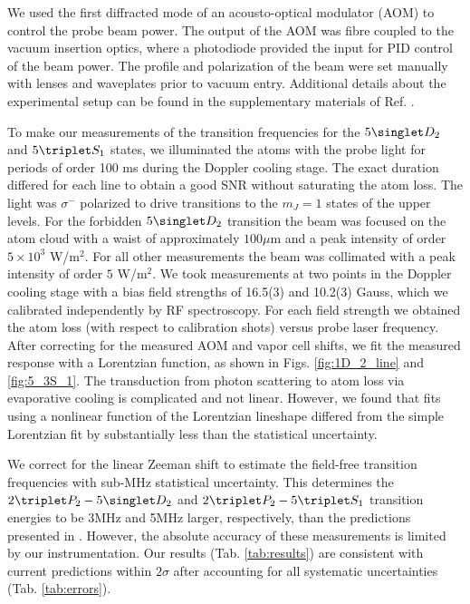 We used the first diffracted mode of an acousto-optical modulator (AOM) to control the probe beam power. The output of the AOM was fibre coupled to the vacuum insertion optics, where a photodiode provided the input for PID control of the beam power. The profile and polarization of the beam were set manually with lenses and waveplates prior to vacuum entry. Additional details about the experimental setup can be found in the supplementary materials of Ref. \cite{Thomas20}.


To make our measurements of the transition frequencies for the $5\singlet D_2$ and $5\triplet S_1$ states, we illuminated the atoms with the probe light for periods of order 100 ms during the Doppler cooling stage. The exact duration differed for each line to obtain a good SNR without saturating the atom loss. The light was $\sigma^-$ polarized to drive transitions to the $m_J=1$ states of the upper levels. For the forbidden $5\singlet D_2$ transition the beam was focused on the atom cloud with a waist of approximately $100\mu$m and a peak intensity of order $5\times 10^3$ W/m$^2$. For all other measurements the beam was collimated with a peak intensity of order $ 5$ W/m$^2$. We took measurements at two points in the Doppler cooling stage with a bias field strengths of {16.5(3)} and {10.2(3)} Gauss, which we calibrated independently by RF spectroscopy. For each field strength we obtained the atom loss (with respect to calibration shots) versus probe laser frequency. After correcting for the measured AOM and vapor cell shifts, we fit the measured response with a Lorentzian function, as shown in Figs. \ref{fig:1D_2_line} and \ref{fig:5_3S_1}. {The transduction from photon scattering to atom loss via evaporative cooling is complicated and not linear. However, we found that fits using a nonlinear function of the Lorentzian lineshape differed from the simple Lorentzian fit by substantially less than the statistical uncertainty.}

We correct for the linear Zeeman shift to estimate the field-free transition frequencies with sub-MHz statistical uncertainty. This determines the $2\triplet P_2-5\singlet D_2$ and $2\triplet P_2-5\triplet S_1$ transition energies to be 3MHz and 5MHz larger, respectively, than the predictions presented in \cite{Drake07}. However, the absolute accuracy of these measurements is limited by our instrumentation. Our results (Tab. \ref{tab:results}) are consistent with current predictions \cite{Drake07} within $2\sigma$ after accounting for all systematic uncertainties (Tab. \ref{tab:errors}).

